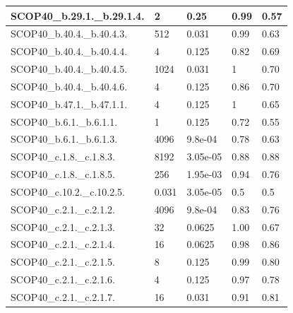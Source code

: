 \documentclass[11pt]{article}
\begin{document}
\begin{longtable}{|p{}|p{}|p{}|p{}|p{}|}
	SCOP40\_b.29.1.\_b.29.1.4.    & 2     & 0.25     & 0.99   & 0.57  \\ \hline
	
	SCOP40\_b.40.4.\_b.40.4.3.    & 512   & 0.031    & 0.99   & 0.63  \\ \hline
	
	SCOP40\_b.40.4.\_b.40.4.4.    & 4     & 0.125    & 0.82   & 0.69  \\ \hline
	
	SCOP40\_b.40.4.\_b.40.4.5.    & 1024  & 0.031    & 1      & 0.70  \\ \hline
	
	SCOP40\_b.40.4.\_b.40.4.6.    & 4     & 0.125    & 0.86   & 0.70  \\ \hline
	
	SCOP40\_b.47.1.\_b.47.1.1.    & 4     & 0.125    & 1      & 0.65  \\ \hline
	
	SCOP40\_b.6.1.\_b.6.1.1.      & 1     & 0.125    & 0.72   & 0.55  \\ \hline
	
	SCOP40\_b.6.1.\_b.6.1.3.      & 4096  & 9.8e-04  & 0.78   & 0.63  \\ \hline
	
	SCOP40\_c.1.8.\_c.1.8.3.      & 8192  & 3.05e-05 & 0.88   & 0.88  \\ \hline
	
	SCOP40\_c.1.8.\_c.1.8.5.      & 256   & 1.95e-03 & 0.94   & 0.76  \\ \hline
	
	SCOP40\_c.10.2.\_c.10.2.5.    & 0.031 & 3.05e-05 & 0.5    & 0.5   \\ \hline
	
	SCOP40\_c.2.1.\_c.2.1.2.      & 4096  & 9.8e-04  & 0.83   & 0.76  \\ \hline
	
	SCOP40\_c.2.1.\_c.2.1.3.      & 32    & 0.0625   & 1.00   & 0.67  \\ \hline
	
	SCOP40\_c.2.1.\_c.2.1.4.      & 16    & 0.0625   & 0.98   & 0.86  \\ \hline
	
	SCOP40\_c.2.1.\_c.2.1.5.      & 8     & 0.125    & 0.99   & 0.80  \\ \hline
	
	SCOP40\_c.2.1.\_c.2.1.6.      & 4     & 0.125    & 0.97   & 0.78  \\ \hline
	
	SCOP40\_c.2.1.\_c.2.1.7.      & 16    & 0.031    & 0.91   & 0.81  \\ \hline
	

\end{longtable}
\end{document}
